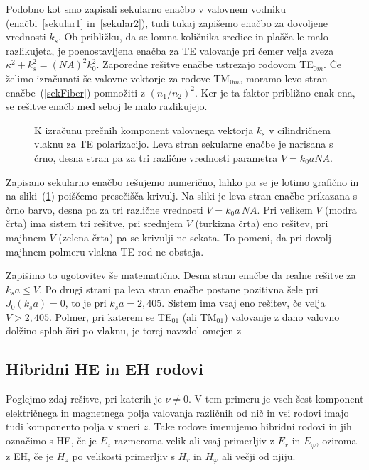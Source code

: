 Podobno kot smo zapisali sekularno enačbo v valovnem vodniku (enačbi~\ref{sekular1}
in~\ref{sekular2}), tudi tukaj zapišemo enačbo za dovoljene vrednosti $k_s$. 
Ob približku, da se lomna količnika
sredice in plašča le malo razlikujeta, je poenostavljena enačba za TE valovanje
pri čemer velja zveza $\kappa^2+k_s^2=(NA)^2k_0^2$. Zaporedne rešitve enačbe ustrezajo rodovom TE$_{0m}$. 
Če želimo izračunati še valovne vektorje za rodove TM$_{0m}$, moramo levo stran enačbe~(\ref{sekFiber}) pomnožiti z $(n_1/n_2)^2$. Ker je ta faktor približno enak ena, se rešitve enačb med seboj le malo razlikujejo.

\begin{figure}[h]
\centering
\def\svgwidth{70truemm} 

\caption{K izračunu prečnih komponent valovnega vektorja $k_s$ v 
cilindričnem vlaknu za TE polarizacijo.
Leva stran sekularne enačbe je narisana s črno, desna stran pa za tri različne vrednosti parametra 
$V=k_0aNA$.}
\label{fig:TEsecFib}
\end{figure} 
Zapisano sekularno enačbo rešujemo numerično, lahko pa se je lotimo grafično in 
na sliki~(\ref{fig:TEsecFib}) poiščemo presečišča krivulj. Na sliki je leva stran enačbe prikazana
s črno barvo, desna pa za tri različne vrednosti $V= k_0 a\,NA$. Pri velikem $V$ (modra črta) ima sistem tri 
rešitve, pri srednjem $V$ (turkizna črta) eno rešitev, pri majhnem $V$ (zelena črta) pa se krivulji
ne sekata. To pomeni, da pri dovolj majhnem polmeru vlakna TE rod ne obstaja. 

Zapišimo to ugotovitev še matematično. Desna stran enačbe da realne rešitve za 
$k_s a \le  V$. Po drugi strani pa leva stran enačbe postane pozitivna šele pri 
$J_0 (k_s a)  = 0$, to je pri $k_s a= 2,405$. Sistem ima vsaj eno rešitev, če velja
$V>2,405$. Polmer, pri katerem se TE$_{01}$ (ali TM$_{01}$) valovanje 
z dano valovno dolžino sploh širi po vlaknu, je torej navzdol omejen z 

\subsection*{Hibridni HE in EH rodovi}
Poglejmo zdaj rešitve, pri katerih je $\nu \neq 0$. V tem primeru je 
vseh šest komponent električnega in magnetnega polja valovanja različnih od nič in vsi rodovi
imajo tudi komponento polja v smeri $z$. Take rodove imenujemo hibridni rodovi in jih 
označimo s HE, če je $E_z$ razmeroma velik ali vsaj primerljiv z $E_r$ in $E_\varphi$, 
oziroma z EH, če je $H_z$ po velikosti primerljiv s $H_r$ in $H_\varphi$ ali večji od njiju. 

